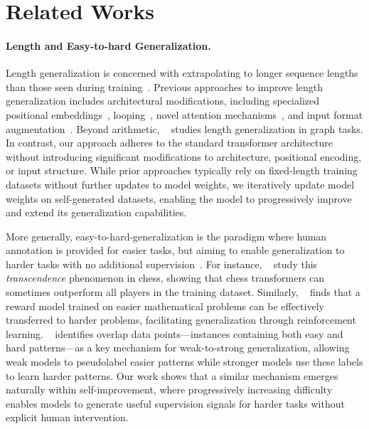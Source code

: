 \section{Related Works}
\label{sec:related_work}

\paragraph{Length and Easy-to-hard Generalization.} 

Length generalization is concerned with extrapolating to longer sequence lengths than those seen during training~\citep{dubois2019location,hupkes2020compositionality,newman2020eos,anil2022exploring}. Previous approaches to improve length generalization includes architectural modifications, including specialized positional embeddings~\citep{press2021train,li2023functional,ruoss2023randomized,kazemnejad2024impact,sabbaghi2024explicitly,Cho2024PositionCI,zhou2024transformers}, looping~\cite{fan2024looped}, novel attention mechanisms~\citep{duan2023interpolation}, and input format augmentation~\citep{zhou2023algorithms,zhou2024transformers}. Beyond arithmetic, ~\citet{yehudai2021local} studies length generalization in graph tasks. In contrast, our approach adheres to the standard transformer architecture without introducing significant modifications to architecture, positional encoding, or input structure. While prior approaches typically rely on fixed-length training datasets without further updates to model weights, we iteratively update model weights on self-generated datasets, enabling the model to progressively improve and extend its generalization capabilities. 

More generally, easy-to-hard-generalization is the paradigm where human annotation is provided for easier tasks, but aiming to enable generalization to harder tasks with no additional supervision~\citep{schwarzschild2021can,bansal2022end,burns2023weak,hase2024unreasonable,sun2024easy}. 
For instance, ~\citet{zhang2024transcendence} study this \textit{transcendence} phenomenon in chess, showing that chess transformers can sometimes outperform all players in the training dataset. Similarly, ~\citet{sun2024easy} finds that a reward model trained on easier mathematical problems can be effectively transferred to harder problems, facilitating generalization through reinforcement learning. ~\citet{shin2024weak} identifies overlap data points—instances containing both easy and hard patterns—as a key mechanism for weak-to-strong generalization, allowing weak models to pseudolabel easier patterns while stronger models use these labels to learn harder patterns. Our work shows that a similar mechanism emerges naturally within self-improvement, where progressively increasing difficulty enables models to generate useful supervision signals for harder tasks without explicit human intervention.














